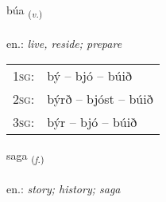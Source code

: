 \documentclass[frontgrid, backgrid]{flacards}\usepackage[]{graphicx}\usepackage[]{xcolor}
\begin{document}
\renewcommand{\flhead}{\vskip5pt \fboxsep=0pt {\small\bfseries\footnotesize Sagnorð | Verb}}
\renewcommand{\fcfoot}{\vskip5pt \fboxsep=0pt \hspace{2pt}{\small\bfseries\footnotesize 1K}}

\renewcommand{\blhead}{\vskip5pt {\small\bfseries\footnotesize Sagnorð | Verb }}
\renewcommand{\bcfoot}{\vskip5pt \hspace{2pt}{\small\bfseries\footnotesize 1K}}


{búa \small{\textsubscript{(\textit{v.})}} \\[1ex] %
\textphonetic{[puːa]} \\
en.: \emph{live, reside; prepare} \\  [2ex]
\renewcommand*{\arraystretch}{0.8}
\begin{tabular}{p{1cm}l}
\textsc{1sg}: & bý -- bjó -- búið \\ 
\textsc{2sg}: & býrð -- bjóst -- búið \\ 
\textsc{3sg}: & býr -- bjó -- búið \\ 
\end{tabular}
}

\renewcommand{\flhead}{\vskip5pt \fboxsep=0pt {\small\bfseries\footnotesize Nafnorð | Noun}}
\renewcommand{\fcfoot}{\vskip5pt \fboxsep=0pt \hspace{2pt}{\small\bfseries\footnotesize 1K}}

\renewcommand{\blhead}{\vskip5pt {\small\bfseries\footnotesize Nafnorð | Noun }}
\renewcommand{\bcfoot}{\vskip5pt \hspace{2pt}{\small\bfseries\footnotesize 1K}}


{saga \small{\textsubscript{(\textit{f.})}} \\[1ex] %
\textphonetic{[saːɣa]} \\
en.: \emph{story; history; saga} \\  [2ex]
\renewcommand*{\arraystretch}{0.8}
}
\end{document}
